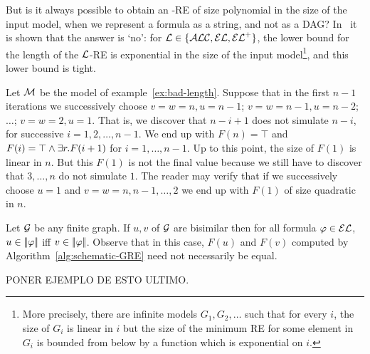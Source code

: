But is it always possible to obtain an \EL-RE of size polynomial in
the size of the input model, when we represent a formula as a
string, and not as a DAG? In~\cite{FG10} it is shown that the answer
is `no': for $\mathcal{L}\in\{\mathcal{ALC}, \mathcal{EL} ,{\mathcal{EL}^+}\}$, the lower bound for the
length of the $\mathcal{L}$-RE is exponential in the size of the input
model\footnote{
  More precisely, there are infinite models $G_1,G_2,\dots$ such that for
  every $i$, the size of $G_i$ is linear in $i$ but the size of the minimum RE
  for some element in $G_i$ is bounded from below by a function which is exponential
  on $i$.
}, and this lower bound is tight.



%


\iffullversion
\begin{ex}
Let $\mathcal{M}$ be the model of example~\ref{ex:bad-length}. Suppose that
in the first $n-1$ iterations we successively choose $v=w=n,u=n-1$;
$v=w=n-1,u=n-2$; $\dots$; $v=w=2,u=1$. That is, we discover that
$n-i+1$ does not simulate $n-i$, for successive $i=1,2,\dots,n-1$.
We end up with $F(n)=\top$ and $F(i)=\top\wedge\exists r. F(i+1)$ for
$i=1,\dots,n-1$. Up to this point, the size of $F(1)$ is linear in
$n$. But this $F(1)$ is not the final value because we still have to
discover that $3,\dots,n$ do not simulate $1$. The reader may verify
that if we successively choose $u=1$ and $v=w=n,n-1,\dots,2$ we end
up with $F(1)$ of size quadratic in $n$.
\end{ex}
\fi

\iffullversion {} Let $\mathcal{G}$
be any finite graph. If $u,v$ of $\mathcal{G}$ are bisimilar then for all
formula $\varphi\in\mathcal{EL}$, $u \in |\!|\varphi|\!|$ iff $v \in
|\!|\varphi|\!|$. Observe that in this case, $F(u)$ and $F(v)$
computed by Algorithm~\ref{alg:schematic-GRE} need not necessarily
be equal.

\begin{ex}
PONER EJEMPLO DE ESTO ULTIMO.
\end{ex}
\fi
